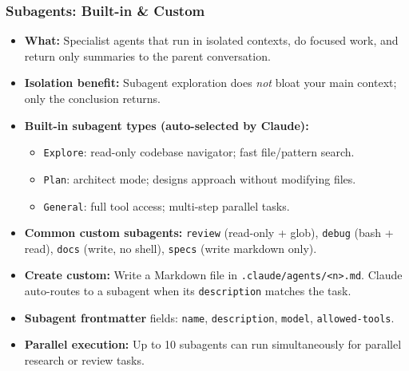 \begin{frame}[fragile]\frametitle{Subagents: Built-in \& Custom}
  \begin{itemize}
    \item \textbf{What:} Specialist agents that run in isolated contexts, do focused work, and return only summaries to the parent conversation.
    \item \textbf{Isolation benefit:} Subagent exploration does \textit{not} bloat your main context; only the conclusion returns.
    \item \textbf{Built-in subagent types (auto-selected by Claude):}
      \begin{itemize}
        \item \texttt{Explore}: read-only codebase navigator; fast file/pattern search.
        \item \texttt{Plan}: architect mode; designs approach without modifying files.
        \item \texttt{General}: full tool access; multi-step parallel tasks.
      \end{itemize}
    \item \textbf{Common custom subagents:} \texttt{review} (read-only + glob), \texttt{debug} (bash + read), \texttt{docs} (write, no shell), \texttt{specs} (write markdown only).
    \item \textbf{Create custom:} Write a Markdown file in \texttt{.claude/agents/<n>.md}. Claude auto-routes to a subagent when its \texttt{description} matches the task.
    \item \textbf{Subagent frontmatter} fields: \texttt{name}, \texttt{description}, \texttt{model}, \texttt{allowed-tools}.
    \item \textbf{Parallel execution:} Up to 10 subagents can run simultaneously for parallel research or review tasks.
  \end{itemize}
\end{frame}


